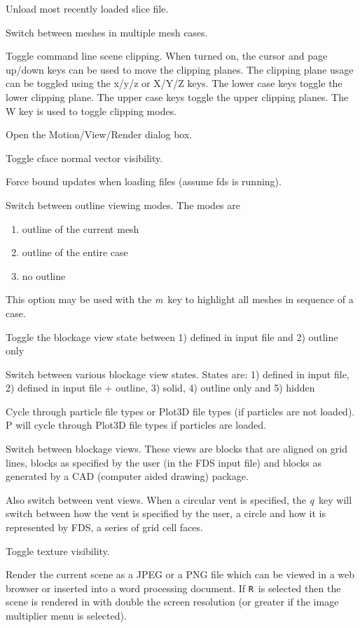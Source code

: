 \documentclass[11pt,twoside]{book}
\newcommand{\kitem}[1]{\item[{\bf {\tt #1 \  }} \hfill]}
\begin{document}
\kitem{L}Unload most recently loaded slice file.


\kitem{m}Switch between meshes in multiple mesh cases.

\kitem{M}Toggle command line scene clipping.  When turned on, the
cursor and page up/down keys can be used to move the clipping planes.
The clipping plane usage can be toggled using the x/y/z or X/Y/Z keys.
The lower case keys toggle the lower clipping plane.  The upper case
keys toggle the upper clipping planes.
The W key is used to toggle clipping modes.

\kitem{ALT m}Open the Motion/View/Render dialog box.

\kitem{n}Toggle cface normal vector visibility.

\kitem{N}Force bound updates when loading files (assume fds is running).

\kitem{o}Switch between outline viewing modes. The modes are
\begin{enumerate}
\item outline of the current mesh
\item outline of the entire case
\item no outline
\end{enumerate}
This option may be used with the {\em m}\ key to highlight all meshes in sequence of a case.

\kitem{O}Toggle the blockage view state between 1) defined in input file and 2) outline only

\kitem{ALT o}Switch between various blockage view states.  States are:
1) defined in input file,
2) defined in input file + outline,
3) solid,
4) outline only and
5) hidden

\kitem{p, P}Cycle through particle file types or Plot3D file types (if particles are not loaded).
P will cycle through Plot3D file types if particles are loaded.

\kitem{q}Switch between blockage views.  These views are blocks
that are aligned on grid lines, blocks as specified by the user
(in the FDS input file) and blocks as generated by a CAD (computer
aided drawing) package.

Also switch between vent views.  When a circular vent is specified,
the {\em q}\ key will switch between how the vent is specified by the user, a circle
and how it is represented by FDS, a series of grid cell faces.

\kitem{Q}Toggle texture visibility.

\kitem{r,R}Render the current scene as a JPEG or a PNG file which
can be viewed in a web browser or inserted into a word processing
document.  If {\tt R}\ is selected then the
scene is rendered in with double the screen resolution (or greater if the image multiplier menu is selected).
\end{document}
